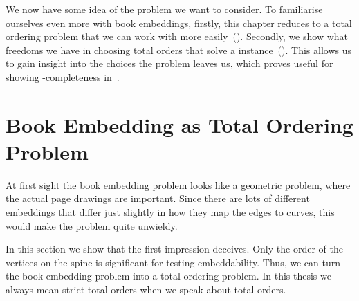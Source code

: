 We now have some idea of the problem we want to consider. 
To familiarise ourselves even more with book embeddings, firstly, this chapter reduces \probBook to a total ordering problem \probBookOrder that we can work with more easily~().
Secondly, we show what freedoms we have in choosing total orders that solve a \probBookOrder instance~(). This allows us to gain insight into the choices the problem leaves us, which proves useful for showing \NP-completeness in~.

\section{Book Embedding as Total Ordering Problem}
\label{section:total-ordering}

At first sight the book embedding problem looks like a geometric problem, where
the actual page drawings are important.
Since there are lots of different embeddings that differ just slightly in how they map the edges to curves, this would make the problem quite unwieldy.

In this section we show that the first impression deceives. Only the order of the vertices on the spine is significant for testing embeddability. Thus, we can turn the book embedding problem into a total ordering problem. In this thesis we always mean strict total orders when we speak about total orders.

